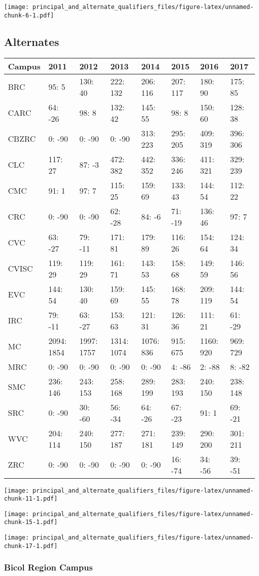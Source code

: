 \documentclass[]{article}
\begin{document}
\texttt{[image: principal\_and\_alternate\_qualifiers\_files/figure-latex/unnamed-chunk-6-1.pdf]}

\hypertarget{alternates}{%
\subsection{Alternates}\label{alternates}}

\begin{longtable}[]{@{}llllllll@{}}
\toprule
Campus & 2011 & 2012 & 2013 & 2014 & 2015 & 2016 & 2017\tabularnewline
\midrule
\endhead
BRC & 95: 5 & 130: 40 & 222: 132 & 206: 116 & 207: 117 & 180: 90 & 175:
85\tabularnewline
CARC & 64: -26 & 98: 8 & 132: 42 & 145: 55 & 98: 8 & 150: 60 & 128:
38\tabularnewline
CBZRC & 0: -90 & 0: -90 & 0: -90 & 313: 223 & 295: 205 & 409: 319 & 396:
306\tabularnewline
CLC & 117: 27 & 87: -3 & 472: 382 & 442: 352 & 336: 246 & 411: 321 &
329: 239\tabularnewline
CMC & 91: 1 & 97: 7 & 115: 25 & 159: 69 & 133: 43 & 144: 54 & 112:
22\tabularnewline
CRC & 0: -90 & 0: -90 & 62: -28 & 84: -6 & 71: -19 & 136: 46 & 97:
7\tabularnewline
CVC & 63: -27 & 79: -11 & 171: 81 & 179: 89 & 116: 26 & 154: 64 & 124:
34\tabularnewline
CVISC & 119: 29 & 119: 29 & 161: 71 & 143: 53 & 158: 68 & 149: 59 & 146:
56\tabularnewline
EVC & 144: 54 & 130: 40 & 159: 69 & 145: 55 & 168: 78 & 209: 119 & 144:
54\tabularnewline
IRC & 79: -11 & 63: -27 & 153: 63 & 121: 31 & 126: 36 & 111: 21 & 61:
-29\tabularnewline
MC & 2094: 1854 & 1997: 1757 & 1314: 1074 & 1076: 836 & 915: 675 & 1160:
920 & 969: 729\tabularnewline
MRC & 0: -90 & 0: -90 & 0: -90 & 0: -90 & 4: -86 & 2: -88 & 8:
-82\tabularnewline
SMC & 236: 146 & 243: 153 & 258: 168 & 289: 199 & 283: 193 & 240: 150 &
238: 148\tabularnewline
SRC & 0: -90 & 30: -60 & 56: -34 & 64: -26 & 67: -23 & 91: 1 & 69:
-21\tabularnewline
WVC & 204: 114 & 240: 150 & 277: 187 & 271: 181 & 239: 149 & 290: 200 &
301: 211\tabularnewline
ZRC & 0: -90 & 0: -90 & 0: -90 & 0: -90 & 16: -74 & 34: -56 & 39:
-51\tabularnewline
\bottomrule
\end{longtable}

\texttt{[image: principal\_and\_alternate\_qualifiers\_files/figure-latex/unnamed-chunk-11-1.pdf]}

\texttt{[image: principal\_and\_alternate\_qualifiers\_files/figure-latex/unnamed-chunk-15-1.pdf]}

\texttt{[image: principal\_and\_alternate\_qualifiers\_files/figure-latex/unnamed-chunk-17-1.pdf]}

\hypertarget{bicol-region-campus}{%
\subsubsection{Bicol Region Campus}\label{bicol-region-campus}}
\end{document}
